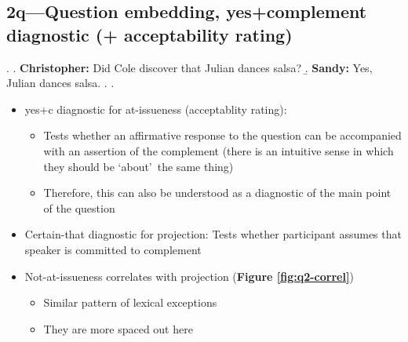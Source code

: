 \documentclass[11pt]{article}
\begin{document}

	\pagebreak
	\subsection{2q---Question embedding, yes+complement diagnostic (+ acceptability rating)} %
		\ex. \a. \textbf{Christopher:} Did Cole discover that Julian dances salsa?
				\b. \textbf{Sandy:} Yes, Julian dances salsa.
				\z.
			\z.

			\begin{itemize}
				\item yes+c diagnostic for at-issueness (acceptablity rating):
				\begin{itemize}
					\item Tests whether an affirmative response to the question can be accompanied with an assertion of the complement (there is an intuitive sense in which they should be \lq about\rq\ the same thing)

					\item Therefore, this can also be understood as a diagnostic of the main point of the question

				\end{itemize}
				

				\item Certain-that diagnostic for projection: Tests whether participant assumes that speaker is committed to complement

				\item Not-at-issueness correlates with projection (\textbf{Figure \ref{fig:q2-correl}})
				\begin{itemize}
					\item Similar pattern of lexical exceptions
					\item They are more spaced out here
				\end{itemize}
			\end{itemize}
\end{document}
